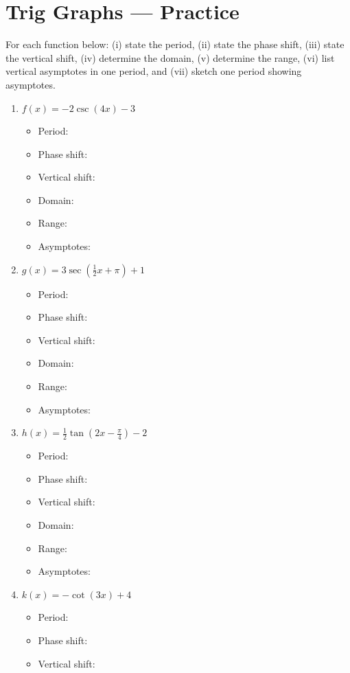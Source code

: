 \documentclass[10pt]{article}
\theoremstyle{definition}
\theoremstyle{plain}
\numberwithin{equation}{section}
\begin{document}
  \section*{Trig Graphs — Practice}
  \begin{multicolblock}{For each function below: (i) state the period, (ii) state the phase shift, (iii) state the vertical shift, (iv) determine the domain, (v) determine the range, (vi) list vertical asymptotes in one period, and (vii) sketch one period showing asymptotes.}
  \begin{enumerate}
    \item $f(x)=-2\csc(4x)-3$
    \begin{itemize}
      \item Period:
      \item Phase shift:
      \item Vertical shift:
      \item Domain:
      \item Range:
      \item Asymptotes:
    \end{itemize}
    \item $g(x)=3\sec\!\left(\tfrac{1}{2}x+\pi\right)+1$
    \begin{itemize}
      \item Period:
      \item Phase shift:
      \item Vertical shift:
      \item Domain:
      \item Range:
      \item Asymptotes:
    \end{itemize}
    \item $h(x)=\tfrac{1}{2}\tan\!\left(2x-\tfrac{\pi}{4}\right)-2$
    \begin{itemize}
      \item Period:
      \item Phase shift:
      \item Vertical shift:
      \item Domain:
      \item Range:
      \item Asymptotes:
    \end{itemize}
    \item $k(x)=-\cot(3x)+4$
    \begin{itemize}
      \item Period:
      \item Phase shift:
      \item Vertical shift:

\end{itemize}
\end{enumerate}
\end{multicolblock}
\end{document}

